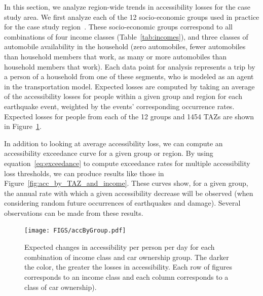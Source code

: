 In this section, we analyze region-wide trends in accessibility losses for the case study area. We first analyze each of the 12 socio-economic groups used in practice for the case study region~\cite{ory_personal_2013}. These socio-economic groups correspond to all combinations of four income classes (Table~\ref{tab:incomes}),
and three classes of automobile availability in the household (zero automobiles, fewer automobiles than household members that work, as many or more automobiles than household members that work). Each data point for analysis represents a trip by a person of a household from one of these segments, who is modeled as an agent in the transportation model.
Expected losses are computed by taking an average of the accessibility losses for people within a given group and region for each earthquake event, weighted by the events' corresponding occurrence rates. Expected losses for people from each of the 12 groups and 1454 TAZs are shown in Figure~\ref{fig:acc_by_segment}. 

In addition to looking at average accessibility loss, we can compute an accessibility exceedance curve for a given group or region. By using equation~\ref{eq:exceedance} to compute exceedance rates for multiple accessibility loss thresholds, we can produce results like those in Figure~\ref{fig:acc_by_TAZ_and_income}. These curves show, for a given group, the annual rate with which a given accessibility decrease will be observed (when considering random future occurrences of earthquakes and damage). Several observations can be made from these results. 


 
\begin{figure}[ht!]
    \centering
    \texttt{[image: FIGS/accByGroup.pdf]}
\caption{Expected changes in accessibility per person per day for each combination of income class and car ownership group. The darker the color, the greater the losses in accessibility. Each row of figures corresponds to an income class and each column corresponds to a class of car ownership). }%
\label{fig:acc_by_segment}
\end{figure}


